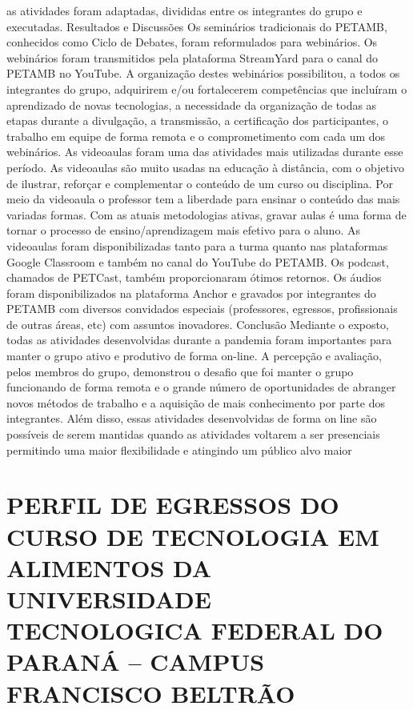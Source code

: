 as atividades foram adaptadas, divididas entre os integrantes do grupo e executadas. 
Resultados e Discussões 
Os seminários tradicionais do PETAMB, conhecidos como Ciclo de Debates, foram reformulados 
para webinários. Os webinários foram transmitidos pela plataforma StreamYard para o canal do 
PETAMB no YouTube. A organização destes webinários possibilitou, a todos os integrantes do 
grupo, adquirirem e/ou fortalecerem competências que incluíram o aprendizado de novas 
tecnologias, a necessidade da organização de todas as etapas durante a divulgação, a transmissão, 
a certificação dos participantes, o trabalho em equipe de forma remota e o comprometimento com 
cada um dos webinários. As videoaulas foram uma das atividades mais utilizadas durante esse
período. As videoaulas são muito usadas na educação à distância, com o objetivo de ilustrar, 
reforçar e complementar o conteúdo de um curso ou disciplina. Por meio da videoaula o professor 
tem a liberdade para ensinar o conteúdo das mais variadas formas. Com as atuais metodologias 
ativas, gravar aulas é uma forma de tornar o processo de ensino/aprendizagem mais efetivo para o 
aluno. As videoaulas foram disponibilizadas tanto para a turma quanto nas plataformas Google 
Classroom e também no canal do YouTube do PETAMB. Os podcast, chamados de PETCast, 
também proporcionaram ótimos retornos. Os áudios foram disponibilizados na plataforma Anchor 
e gravados por integrantes do PETAMB com diversos convidados especiais (professores, egressos, 
profissionais de outras áreas, etc) com assuntos inovadores. 
Conclusão 
Mediante o exposto, todas as atividades desenvolvidas durante a pandemia foram importantes para 
manter o grupo ativo e produtivo de forma on-line. A percepção e avaliação, pelos membros do 
grupo, demonstrou o desafio que foi manter o grupo funcionando de forma remota e o grande 
número de oportunidades de abranger novos métodos de trabalho e a aquisição de mais 
conhecimento por parte dos integrantes. Além disso, essas atividades desenvolvidas de forma online são possíveis de serem mantidas quando as atividades voltarem a ser presenciais permitindo 
uma maior flexibilidade e atingindo um público alvo maior



\section{PERFIL DE EGRESSOS DO CURSO DE TECNOLOGIA EM ALIMENTOS DA UNIVERSIDADE TECNOLOGICA FEDERAL DO PARANÁ – CAMPUS FRANCISCO BELTRÃO}

